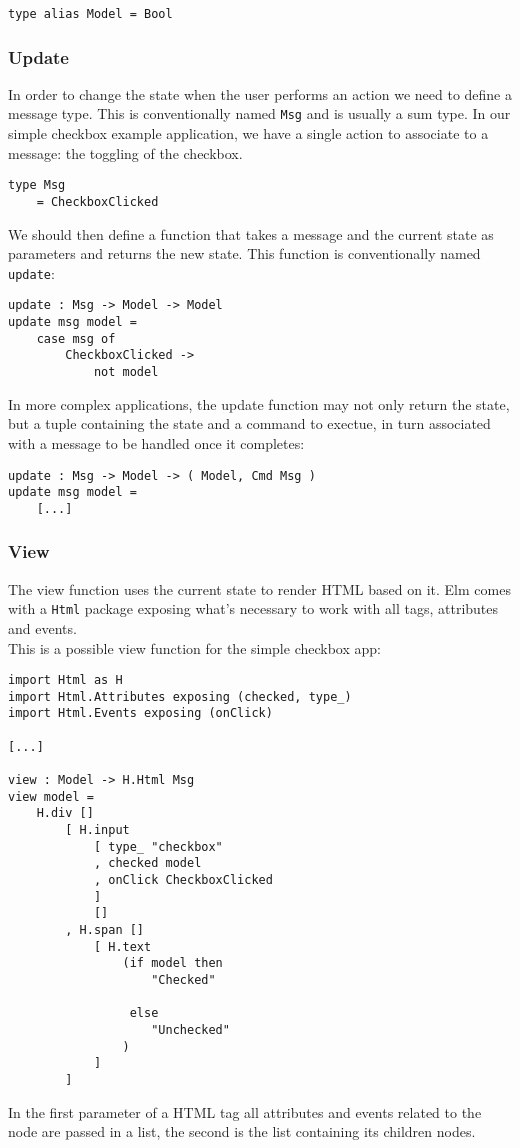 \begin{verbatim}
type alias Model = Bool
\end{verbatim}

\subsubsection{Update}
In order to change the state when the user performs an action we need to define a message type. This is conventionally named \texttt{Msg} and is usually a sum type. In our simple checkbox example application, we have a single action to associate to a message: the toggling of the checkbox.
\begin{verbatim}
type Msg
    = CheckboxClicked
\end{verbatim}

We should then define a function that takes a message and the current state as parameters and returns the new state. This function is conventionally named \texttt{update}:
\begin{verbatim}
update : Msg -> Model -> Model
update msg model =
    case msg of
        CheckboxClicked ->
            not model
\end{verbatim}

In more complex applications, the update function may not only return the state, but a tuple containing the state and a command to exectue, in turn associated with a message to be handled once it completes:
\begin{verbatim}
update : Msg -> Model -> ( Model, Cmd Msg )
update msg model =
    [...]
\end{verbatim}

\subsubsection{View}
The view function uses the current state to render HTML based on it. Elm comes with a \texttt{Html} package exposing what's necessary to work with all tags, attributes and events.\\
This is a possible view function for the simple checkbox app:
\begin{verbatim}
import Html as H
import Html.Attributes exposing (checked, type_)
import Html.Events exposing (onClick)

[...]

view : Model -> H.Html Msg
view model =
    H.div []
        [ H.input
            [ type_ "checkbox"
            , checked model
            , onClick CheckboxClicked
            ]
            []
        , H.span []
            [ H.text
                (if model then
                    "Checked"

                 else
                    "Unchecked"
                )
            ]
        ]
\end{verbatim}
In the first parameter of a HTML tag all attributes and events related to the node are passed in a list, the second is the list containing its children nodes.\\

